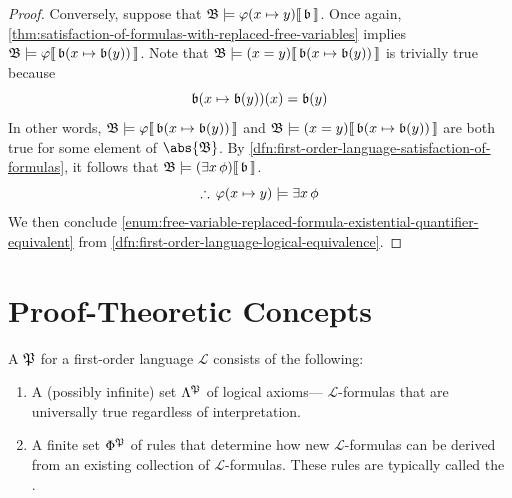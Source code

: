 \begin{proof}
    \vspace{0.3cm}
    \noindent
    Conversely, suppose that \( \folwffsatisfaction{\mathfrak{B}}{ \folfreevariablereplacement{\varphi}{x}{y} }{ \mathfrak{b} } \).
    Once again, \cref{thm:satisfaction-of-formulas-with-replaced-free-variables} implies
    \( \folwffsatisfaction{\mathfrak{B}}{ \varphi }{ \folmodifiedvariableassignmentfunction{\mathfrak{b}}{x}{\mathfrak{b}(y)} } \).
    Note that \( \folwffsatisfaction{\mathfrak{B}}{\mleft( x = y \mright)}{ \folmodifiedvariableassignmentfunction{\mathfrak{b}}{x}{\mathfrak{b}(y)} } \)
    is trivially true because
    \begin{equation*}
        \folmodifiedvariableassignmentfunction{\mathfrak{b}}{x}{\mathfrak{b}(y)}(x) = \mathfrak{b}(y)
    \end{equation*}
    In other words, \( \folwffsatisfaction{\mathfrak{B}}{ \varphi }{ \folmodifiedvariableassignmentfunction{\mathfrak{b}}{x}{\mathfrak{b}(y)} } \)
    and \( \folwffsatisfaction{\mathfrak{B}}{\mleft( x = y \mright)}{ \folmodifiedvariableassignmentfunction{\mathfrak{b}}{x}{\mathfrak{b}(y)} } \)
    are both true for some element of \( \abs{\mathfrak{B}} \). By \cref{dfn:first-order-language-satisfaction-of-formulas}, it follows that
    \( \folwffsatisfaction{\mathfrak{B}}{ \mleft( \exists x \, \phi \mright) }{\mathfrak{b}} \).
    \begin{equation*}
        \therefore \, \folfreevariablereplacement{\varphi}{x}{y} \models \exists x \, \phi
    \end{equation*}
    We then conclude \ref{enum:free-variable-replaced-formula-existential-quantifier-equivalent} from \cref{dfn:first-order-language-logical-equivalence}.
\end{proof}

\chapter{Proof-Theoretic Concepts}
\begin{dfn}
     \label{dfn:proof-system}
    A  \( \mathfrak{P} \) for a first-order language \( \mathcal{L} \) consists of the following:
    \begin{enumerate}[topsep=2pt,noitemsep,label=\textup{\texttt{(\alph*)}}]
        \item A (possibly infinite) set \( \Lambda^{\mathfrak{P}} \) of logical axioms--- \( \mathcal{L} \)-formulas that are universally true regardless of
            interpretation.
        \item A finite set \( \Phi^{\mathfrak{P}} \) of rules that determine how new \( \mathcal{L} \)-formulas can be derived from an existing
            collection of \( \mathcal{L} \)-formulas. These rules are typically called the .
    \end{enumerate}
\end{dfn}

